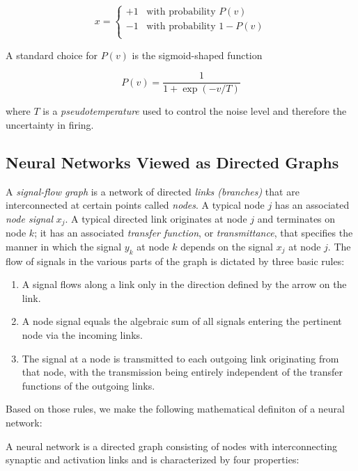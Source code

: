 \documentclass[twocolumn]{article}
\begin{document}
	 $$x =
		 \begin{cases}
			 +1 \;\;\; \text{with probability } P (v)     \\
			 -1 \;\;\; \text{with probability } 1 - P (v) \\
		 \end{cases}
	 $$

	 A standard choice for $ P (v) $ is the sigmoid-shaped function

	 $$ P (v) = \dfrac{1}{1 + \exp (-v / T)} $$

	 \noindent where $ T $ is a \textit{pseudotemperature} used to control the noise level and therefore the uncertainty in firing.

 \subsection{Neural Networks Viewed as Directed Graphs}

	 A \textit{signal-flow graph} is a network of directed \textit{links (branches)} that are interconnected at certain points called \textit{nodes}. A typical node $ j $ has an associated \textit{node signal} $ x_j $. A typical directed link originates at node $ j $ and terminates on node $ k $; it has an associated \textit{transfer function}, or \textit{transmittance}, that specifies the manner in which the signal $ y_k $ at node $ k $ depends on the signal $ x_j $ at node $ j $. The flow of signals in the various parts of the graph is dictated by three basic rules:

	 \begin{enumerate}
		 \item A signal flows along a link only in the direction defined by the arrow on the link.
		 \item A node signal equals the algebraic sum of all signals entering the pertinent node via the incoming links.
		 \item The signal at a node is transmitted to each outgoing link originating from that node, with the transmission being entirely independent of the transfer functions of the outgoing links.
	 \end{enumerate}

	 Based on those rules, we make the following mathematical definiton of a neural network:

	 A neural network is a directed graph consisting of nodes with interconnecting synaptic and activation links and is characterized by four properties:
\end{document}
